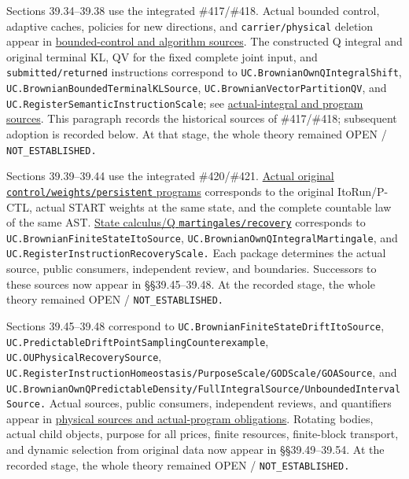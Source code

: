 \documentclass[
  english,
  11pt,
  oneside]{book}
\begin{document}
Sections 39.34--39.38 use the integrated \#417/\#418. Actual bounded control, adaptive caches, policies for new directions, and \nolinkurl{carrier/physical} deletion appear in \href{../formalization/ueot-core/docs/compression/theory_completion/unified_closure/bounded_control_carrier_source_v1/RESULTS_AND_OPEN_OBLIGATIONS.md}{bounded-control and algorithm sources}. The constructed Q integral and original terminal KL, QV for the fixed complete joint input, and \nolinkurl{submitted/returned} instructions correspond to \nolinkurl{UC.BrownianOwnQIntegralShift}, \nolinkurl{UC.BrownianBoundedTerminalKLSource}, \nolinkurl{UC.BrownianVectorPartitionQV}, and \nolinkurl{UC.RegisterSemanticInstructionScale}; see \href{../formalization/ueot-core/docs/compression/theory_completion/unified_closure/q_integral_vector_qv_program_source_v1/RESULTS_AND_OPEN_OBLIGATIONS.md}{actual-integral and program sources}. This paragraph records the historical sources of \#417/\#418; subsequent adoption is recorded below. At that stage, the whole theory remained OPEN / \nolinkurl{NOT_ESTABLISHED.}

Sections 39.39--39.44 use the integrated \#420/\#421. \href{../formalization/ueot-core/docs/compression/theory_completion/unified_closure/fixed_q_run_stateweighted_source_v1/RESULTS_AND_OPEN_OBLIGATIONS.md}{Actual original \nolinkurl{control/weights/persistent} programs} corresponds to the original ItoRun/P-CTL, actual START weights at the same state, and the complete countable law of the same AST. \href{../formalization/ueot-core/docs/compression/theory_completion/unified_closure/state_ito_q_martingale_recovery_source_v1/RESULTS_AND_OPEN_OBLIGATIONS.md}{State calculus/Q \nolinkurl{martingales/recovery}} corresponds to \nolinkurl{UC.BrownianFiniteStateItoSource}, \nolinkurl{UC.BrownianOwnQIntegralMartingale}, and \nolinkurl{UC.RegisterInstructionRecoveryScale.} Each package determines the actual source, public consumers, independent review, and boundaries. Successors to these sources now appear in §§39.45--39.48. At the recorded stage, the whole theory remained OPEN / \nolinkurl{NOT_ESTABLISHED.}

Sections 39.45--39.48 correspond to \nolinkurl{UC.BrownianFiniteStateDriftItoSource}, \nolinkurl{UC.PredictableDriftPointSamplingCounterexample}, \nolinkurl{UC.OUPhysicalRecoverySource}, \nolinkurl{UC.RegisterInstructionHomeostasis/PurposeScale/GODScale/GOASource}, and \nolinkurl{UC.BrownianOwnQPredictableDensity/FullIntegralSource/UnboundedIntervalSource.} Actual sources, public consumers, independent reviews, and quantifiers appear in \href{../formalization/ueot-core/docs/compression/theory_completion/unified_closure/drift_ou_instruction_qfull_source_v1/RESULTS_AND_OPEN_OBLIGATIONS.md}{physical sources and actual-program obligations}. Rotating bodies, actual child objects, purpose for all prices, finite resources, finite-block transport, and dynamic selection from original data now appear in §§39.49--39.54. At the recorded stage, the whole theory remained OPEN / \nolinkurl{NOT_ESTABLISHED.}
\end{document}
